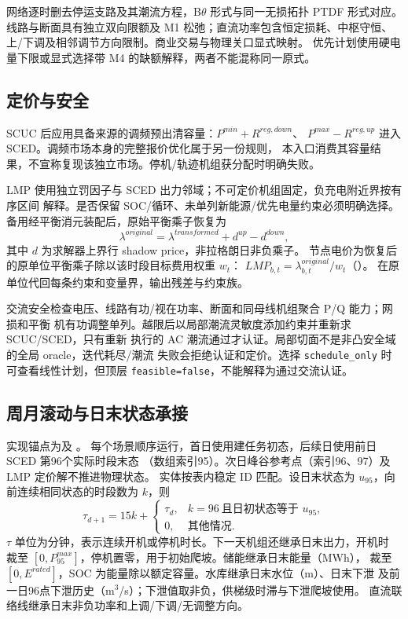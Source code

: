网络逐时删去停运支路及其潮流方程，B$\theta$ 形式与同一无损拓扑 PTDF 形式对应。
线路与断面具有独立双向限额及 M1 松弛；直流功率包含恒定损耗、中枢守恒、
上/下调及相邻调节方向限制。商业交易与物理关口显式映射。
优先计划使用硬电量下限或显式选择带 M4 的缺额解释，两者不能混称同一原式。

\subsection{定价与安全}
SCUC 后应用具备来源的调频预出清容量：$P^{min}+R^{reg,down}$、
$P^{max}-R^{reg,up}$ 进入 SCED。调频市场本身的完整报价优化属于另一份规则，
本入口消费其容量结果，不宣称复现该独立市场。停机/轨迹机组获分配时明确失败。

LMP 使用独立罚因子与 SCED 出力邻域；不可定价机组固定，负充电附近界按有序区间
解释。是否保留 SOC/循环、未单列新能源/优先电量约束必须明确选择。
备用经平衡消元装配后，原始平衡乘子恢复为
\begin{equation}
 \lambda^{original}=\lambda^{transformed}+d^{up}-d^{down},
\end{equation}
其中 $d$ 为求解器上界行 shadow price，非拉格朗日非负乘子。
节点电价为恢复后的原单位平衡乘子除以该时段目标费用权重 $w_t$：
$LMP_{b,t}=\lambda^{original}_{b,t}/w_t$（）。
 在原单位代回每条约束和变量界，输出残差与约束族。

交流安全检查电压、线路有功/视在功率、断面和同母线机组聚合 P/Q 能力；网损和平衡
机有功调整单列。越限后以局部潮流灵敏度添加约束并重新求 SCUC/SCED，只有重新
执行的 AC 潮流通过才认证。局部切面不是非凸安全域的全局 oracle，迭代耗尽/潮流
失败会拒绝认证和定价。选择 \texttt{schedule\_only} 时可查看线性计划，但顶层
\texttt{feasible=false}，不能解释为通过交流认证。

\subsection{周月滚动与日末状态承接}
实现锚点为及
。
每个场景顺序运行，首日使用建任务初态，后续日使用前日 SCED 第96个实际时段末态
（数组索引95）。次日峰谷参考点（索引96、97）及 LMP 定价解不推进物理状态。
实体按表内稳定 ID 匹配。设日末状态为 $u_{95}$，向前连续相同状态的时段数为 $k$，则
\begin{equation}
 \tau_{d+1}=15k+
 \begin{cases}
 \tau_d,&k=96\ \text{且日初状态等于 }u_{95},\\
 0,&\text{其他情况}.
 \end{cases}
\end{equation}
$\tau$ 单位为分钟，表示连续开机或停机时长。下一天机组还继承日末出力，开机时
裁至 $[0,P^{max}_{95}]$，停机置零，用于初始爬坡。储能继承日末能量（MWh），
裁至 $[0,E^{rated}]$，SOC 为能量除以额定容量。水库继承日末水位（m）、日末下泄
及前一日96点下泄历史（m$^3$/s）；下泄值取非负，供梯级时滞与下泄爬坡使用。
直流联络线继承日末非负功率和上调/下调/无调整方向。

